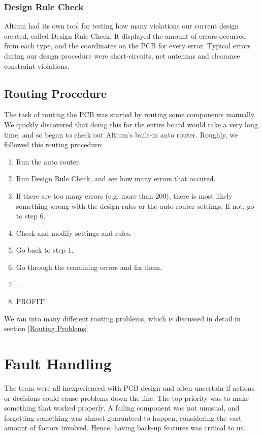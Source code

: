 \subsubsection{Design Rule Check}
Altium had its own tool for testing how many violations our current design created, called Design Rule Check. It displayed the amount of errors occurred from each type, and the coordinates on the PCB for every error. 
Typical errors during our design procedure were short-circuits, net antennas and clearance constraint violations.
\subsection{Routing Procedure}
The task of routing the PCB was started by routing some components manually. We quickly discovered that doing this for the entire board would take a very long time, and so began to check out Altium's built-in auto router. 
\newline
\newline
Roughly, we followed this routing procedure:
\begin{enumerate}
\item Run the auto router.
\item Run Design Rule Check, and see how many errors that occured. 
\item If there are too many errors (e.g. more than 200), there is most likely something wrong with the design rules or the auto router settings. If not, go to step 6.
\item Check and modify settings and rules.
\item Go back to step 1.
\item Go through the remaining errors and fix them. 
\item ...
\item PROFIT!
\end{enumerate}
We ran into many different routing problems, which is discussed in detail in section \ref{Routing Problems}

\section{Fault Handling}
The team were all inexperienced with PCB design and often uncertain if actions or decisions could cause problems down the line. The top priority was to make something that worked properly. A failing component was not unusual, and forgetting something was almost guaranteed to happen, considering the vast amount of factors involved. Hence, having back-up features was critical to us.
